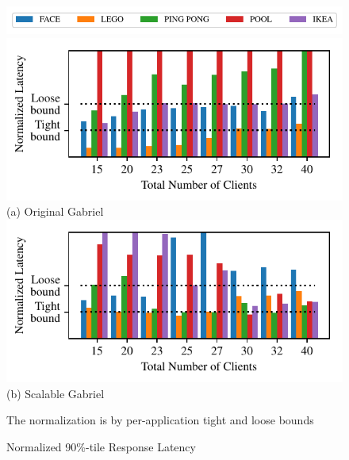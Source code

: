 \begin{figure}[t]
  \begin{center}
    \includegraphics[width=\linewidth]{FIGS/fig-alloc-latency-legend.pdf}
    \includegraphics[width=\linewidth]{FIGS/fig-alloc-latency-baseline.pdf}
    {\small (a) Original Gabriel}
    \includegraphics[width=\linewidth]{FIGS/fig-alloc-latency-cpushares.pdf}
    {\small (b) Scalable Gabriel}
  \end{center}
\begin{captiontext}
The normalization is  by per-application tight and loose bounds~\cite{chen2017empirical}
\end{captiontext}
\vspace{-0.1in}
  \caption{\small Normalized 90\%-tile Response Latency}
  \label{fig:alloc-latency}
\end{figure}

